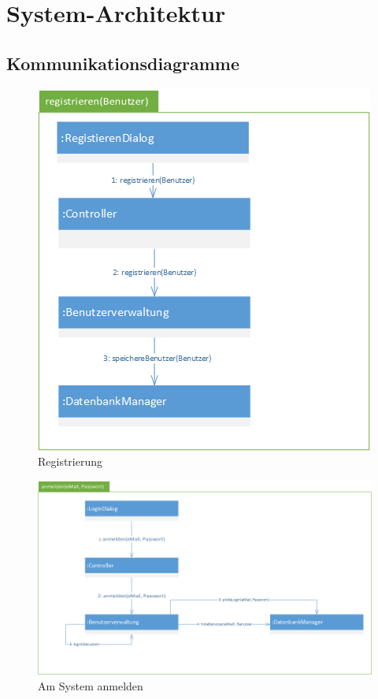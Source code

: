 \documentclass[12pt,a4paper]{article}
\begin{document}
\section{System-Architektur}

\subsection{Kommunikationsdiagramme}

\begin{figure}[H]
	\centering
	\includegraphics[width=0.7\linewidth]{Bilder/Kommunikationsdiagramme/registrieren}
	\caption{Registrierung}
	\label{Registrierung}
\end{figure}

\begin{figure}[H]
\centering
\includegraphics[width=0.7\linewidth]{Bilder/Kommunikationsdiagramme/anmelden}
\caption{Am System anmelden}
\label{Am System anmelden}
\end{figure}
\end{document}
